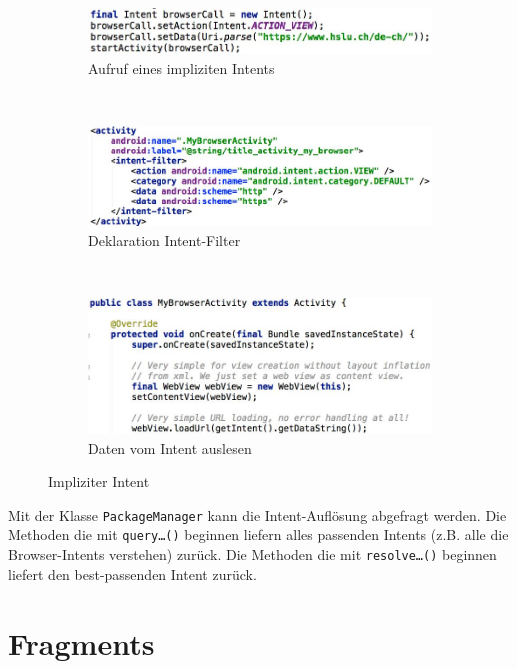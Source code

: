 \begin{figure}
	\centering
	\begin{subfigure}[b]{0.3\textwidth}
		\includegraphics[width=\textwidth]{fig/impliziter-intent-aufruf}
		\caption{Aufruf eines impliziten Intents}
	\end{subfigure}
	~
	\begin{subfigure}[b]{0.3\textwidth}
		\includegraphics[width=\textwidth]{fig/impliziter-intent-xml}
		\caption{Deklaration Intent-Filter}
	\end{subfigure}
	~
	\begin{subfigure}[b]{0.3\textwidth}
		\includegraphics[width=\textwidth]{fig/impliziter-intent-activity}
		\caption{Daten vom Intent auslesen}
	\end{subfigure}
	\caption{Impliziter Intent}
	\label{fig:impliziter-intent}
\end{figure}
Mit der Klasse \texttt{PackageManager} kann die  Intent-Auflösung abgefragt werden. Die Methoden die mit \texttt{query\dots()} beginnen liefern alles passenden Intents (z.B. alle die Browser-Intents verstehen) zurück. Die Methoden die mit \texttt{resolve\dots()} beginnen liefert den best-passenden Intent zurück.

\section{Fragments}

